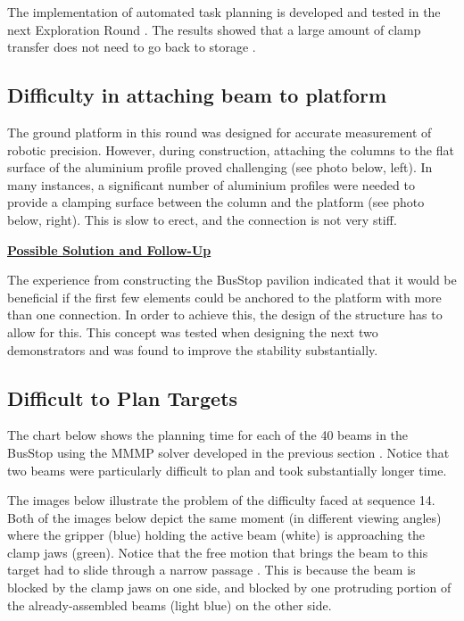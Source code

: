 The implementation of automated task planning is developed and tested in the next Exploration Round . The results showed that a large amount of clamp transfer does not need to go back to storage .

\subsection{Difficulty in attaching beam to platform}
\label{subsection:exploration-3-difficulty-in-attaching-beam-to-platform}

The ground platform in this round was designed for accurate measurement of robotic precision. However, during construction, attaching the columns to the flat surface of the aluminium profile proved challenging (see photo below, left). In many instances, a significant number of aluminium profiles were needed to provide a clamping surface between the column and the platform (see photo below, right). This is slow to erect, and the connection is not very stiff.




\textbf{\ul{Possible Solution and Follow-Up}}

The experience from constructing the BusStop pavilion indicated that it would be beneficial if the first few elements could be anchored to the platform with more than one connection. In order to achieve this, the design of the structure has to allow for this. This concept was tested when designing the next two demonstrators and was found to improve the stability substantially.

\subsection{Difficult to Plan Targets}
\label{subsection:exploration-3-difficult-to-plan-targets}

The chart below \parencite{huangNewAnalogProtocol2021} shows the planning time for each of the 40 beams in the BusStop using the MMMP solver developed in the previous section . Notice that two beams were particularly difficult to plan and took substantially longer time. 




The images below illustrate the problem of the difficulty faced at sequence 14. Both of the images below depict the same moment (in different viewing angles) where the gripper (blue) holding the active beam (white) is approaching the clamp jaws (green). Notice that the free motion that brings the beam to this target had to slide through a narrow passage . This is because the beam is blocked by the clamp jaws on one side, and blocked by one protruding portion of the already-assembled beams (light blue) on the other side.

